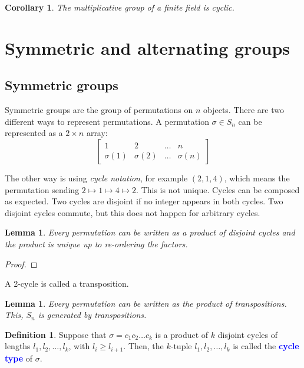 \documentclass[12pt]{report}
\newcommand{\indx}[1]{\index{#1}\textbf{\textcolor{blue}{#1}}}
\newtheorem{lemma}[theorem]{Lemma}
\newtheorem{corollary}[theorem]{Corollary}
\theoremstyle{definition}
\newtheorem{definition}[theorem]{Definition}
\begin{document}
\begin{corollary}
  The multiplicative group of a finite field is cyclic.
\end{corollary}

\section{Symmetric and alternating groups}

\subsection{Symmetric groups}

Symmetric groups are the group of permutations on \(n\) objects. There are two different ways to represent permutations. A permutation \(\sigma \in S_{n}\) can be represented as a \(2 \times n\) array:
\begin{equation}
  \begin{bmatrix}
    1 & 2 & \ldots & n \\
    \sigma(1) & \sigma(2) & \ldots & \sigma(n)
  \end{bmatrix}
\end{equation}

The other way is using \emph{cycle notation}, for example \((2,1,4)\), which means the permutation sending \(2 \mapsto 1 \mapsto 4 \mapsto 2\). This is not unique. Cycles can be composed as expected. Two cycles are disjoint if no integer appears in both cycles. Two disjoint cycles commute, but this does not happen for arbitrary cycles.

\begin{lemma}
  Every permutation can be written as a product of disjoint cycles and the product is unique up to re-ordering the factors.
\end{lemma}
\begin{proof}
\end{proof}

A 2-cycle is called a transposition.

\begin{lemma}
  Every permutation can be written as the product of transpositions. This, \(S_{n}\) is generated by transpositions.
\end{lemma}


\begin{definition}
  Suppose that \(\sigma = c_{1}c_{2} \ldots c_{k}\) is a product of \(k\) disjoint cycles of lengths \(l_{1}, l_{2}, \ldots, l_{k}\), with \(l_{i} \geq l_{i+1}\). Then, the \(k\)-tuple \(l_{1}, l_{2}, \ldots, l_{k}\) is called the \indx{cycle type} of \(\sigma\).
\end{definition}
\end{document}
